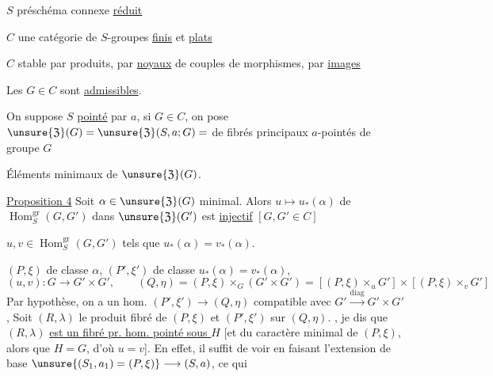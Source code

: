 $S$ préschéma connexe \uline{réduit}



$C$ une catégorie de $S$-groupes \uline{finis} et \uline{plats}

$C$ stable par produits,  par \uline{noyaux}
 de couples de morphismes, par \uline{images}

Les $G\in C$ sont \uline{admissibles}.

On  suppose $S$ \uline{pointé} par $a$,
si $G\in C$, on pose
$\unsure{\mathfrak{Z}}(G)=\unsure{\mathfrak{Z}}(S,a;G)=$
 de fibrés  principaux
$a$-pointés de groupe $G$

Éléments minimaux de $\unsure{\mathfrak{Z}}(G)$.

\uline{Proposition 4} Soit $\alpha\in\unsure{\mathfrak{Z}}(G)$ minimal.
Alors $u\mapsto u_*(\alpha)$ de
$\operatorname{Hom}^{\mathrm{gr}}_S(G,G')$ dans
$\unsure{\mathfrak{Z}}(G')$ est \uline{injectif}
$[G,G'\in C]$

$u,v\in\operatorname{Hom}^{\mathrm{gr}}_S(G,G')$ tels que
$u_*(\alpha)=v_*(\alpha)$.

$(P,\xi)$ de classe $\alpha$, $(P',\xi')$ de classe
$u_*(\alpha)=v_*(\alpha)$,
\[
(u,v):G\longrightarrow G'\times G',\qquad
(Q,\eta)=(P,\xi)\mathbin{\times_G}(G'\times G')
=[(P,\xi)\mathbin{\times_u}G']\times[(P,\xi)\mathbin{\times_v}G']
\]
Par hypothèse, on a un hom. 
$(P',\xi')\longrightarrow(Q,\eta)$ compatible avec
$G'\xrightarrow{\mathrm{diag}}G'\times G'$,
Soit $(R,\lambda)$ le produit fibré de $(P,\xi)$ et $(P',\xi')$ sur $(Q,\eta)$.
,
je dis que $(R,\lambda)$ \uline{est un fibré pr. hom. pointé sous $H$}
[et du caractère minimal de $(P,\xi)$,  alors que
$H=G$, d'où $u=v$]. En effet, il suffit de  voir
 en faisant l'extension de base
$\unsure{(S_1,a_1)=(P,\xi)}\longrightarrow(S,a)$,
ce qui 

